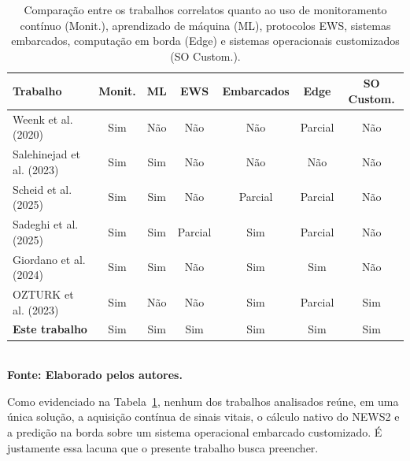 \begin{table}[H]
\centering
\caption{Comparação entre os trabalhos correlatos quanto ao uso de monitoramento contínuo (Monit.), aprendizado de máquina (ML), protocolos EWS, sistemas embarcados, computação em borda (Edge) e sistemas operacionais customizados (SO Custom.).}
\label{tableCorrelatos}
\begin{tabular}{ |l|c|c|c|c|c|c| }
    \hline
    \textbf{Trabalho} & \textbf{Monit.} & \textbf{ML} & \textbf{EWS} & \textbf{Embarcados} & \textbf{Edge} & \textbf{SO Custom.} \\
    \hline
    Weenk et al. (2020)         & Sim & Não & Não       & Não & Parcial & Não \\
    Salehinejad et al. (2023)   & Sim & Sim & Não       & Não & Não     & Não \\
    Scheid et al. (2025)        & Sim & Sim & Não       & Parcial & Parcial     & Não \\
    Sadeghi et al. (2025)       & Sim & Sim & Parcial   & Sim & Parcial & Não \\
    Giordano et al. (2024)      & Sim & Sim & Não       & Sim & Sim & Não \\
    OZTURK et al. (2023)        & Sim & Não & Não       & Sim & Parcial & Sim \\
    \textbf{Este trabalho}      & Sim & Sim & Sim       & Sim & Sim     & Sim \\
    \hline
\end{tabular}
{\footnotesize\\ \textbf{Fonte: Elaborado pelos autores.}}
\end{table}

Como evidenciado na Tabela~\ref{tableCorrelatos}, nenhum dos trabalhos analisados reúne, em uma única solução, a aquisição contínua de sinais vitais, o cálculo nativo do NEWS2 e a predição na borda sobre um sistema operacional embarcado customizado. É justamente essa lacuna que o presente trabalho busca preencher.